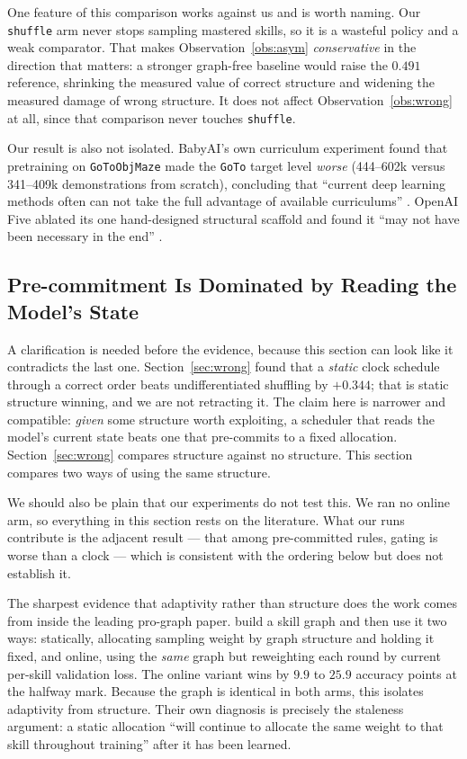 \documentclass[11pt]{article}
\theoremstyle{plain}
\theoremstyle{definition}
\theoremstyle{remark}
\begin{document}
One feature of this comparison works against us and is worth naming. Our
\texttt{shuffle} arm never stops sampling mastered skills, so it is a wasteful
policy and a weak comparator. That makes Observation~\ref{obs:asym}
\emph{conservative} in the direction that matters: a stronger graph-free baseline
would raise the $0.491$ reference, shrinking the measured value of correct
structure and widening the measured damage of wrong structure. It does not affect
Observation~\ref{obs:wrong} at all, since that comparison never touches
\texttt{shuffle}.

Our result is also not isolated. BabyAI's own curriculum experiment found that
pretraining on \texttt{GoToObjMaze} made the \texttt{GoTo} target level
\emph{worse} (444--602k versus 341--409k demonstrations from scratch), concluding
that ``current deep learning methods often can not take the full advantage of
available curriculums'' \citep{chevalierboisvert2019babyai}. OpenAI Five ablated
its one hand-designed structural scaffold and found it ``may not have been
necessary in the end'' \citep{berner2019dota}.

\subsection{Pre-commitment Is Dominated by Reading the Model's State}
\label{sec:static}

A clarification is needed before the evidence, because this section can look like
it contradicts the last one. Section~\ref{sec:wrong} found that a \emph{static}
clock schedule through a correct order beats undifferentiated shuffling by
$+0.344$; that is static structure winning, and we are not retracting it. The
claim here is narrower and compatible: \emph{given} some structure worth
exploiting, a scheduler that reads the model's current state beats one that
pre-commits to a fixed allocation. Section~\ref{sec:wrong} compares structure
against no structure. This section compares two ways of using the same structure.

We should also be plain that our experiments do not test this. We ran no online
arm, so everything in this section rests on the literature. What our runs
contribute is the adjacent result --- that among pre-committed rules, gating is
worse than a clock --- which is consistent with the ordering below but does not
establish it.

The sharpest evidence that adaptivity rather than structure does the work comes
from inside the leading pro-graph paper. \citet{chen2023skillit} build a skill
graph and then use it two ways: statically, allocating sampling weight by graph
structure and holding it fixed, and online, using the \emph{same} graph but
reweighting each round by current per-skill validation loss. The online variant
wins by $9.9$ to $25.9$ accuracy points at the halfway mark. Because the graph is
identical in both arms, this isolates adaptivity from structure. Their own
diagnosis is precisely the staleness argument: a static allocation ``will
continue to allocate the same weight to that skill throughout training'' after it
has been learned.
\end{document}
